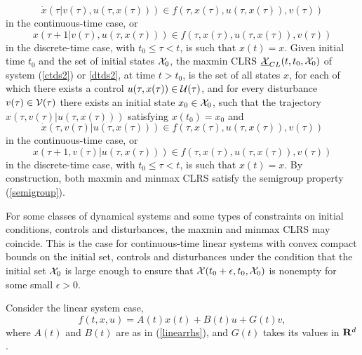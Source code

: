 \[ \dot{x}(\tau | v(\tau), u(\tau, x(\tau))) \in
f(\tau, x(\tau), u(\tau, x(\tau)), v(\tau)) \]
in the continuous-time case, or
\[ x(\tau+1 | v(\tau), u(\tau, x(\tau))) \in
f(\tau, x(\tau), u(\tau, x(\tau)), v(\tau)) \]
in the discrete-time case, with $t_0\leq\tau<t$, is such that $x(t)=x$.
\label{def_maxminclrs}
\ed
{}
Given initial time $t_0$ and the set of initial states $\XX_0$, the maxmin
CLRS $\UXCL(t, t_0, \XX_0)$ of system (\ref{ctds2}) or \ref{dtds2}, at time
$t>t_0$, is the set of all states $x$, for each of which there exists a control
$u(\tau, x(\tau))\in\UU(\tau)$, and for every disturbance $v(\tau)\in\VV(\tau)$
there exists  an initial state $x_0\in\XX_0$, such that the trajectory
$x(\tau, v(\tau) | u(\tau, x(\tau)))$ satisfying $x(t_0) = x_0$ and
\[ \dot{x}(\tau, v(\tau) | u(\tau, x(\tau))) \in
f(\tau, x(\tau), u(\tau, x(\tau)), v(\tau)) \]
in the continuous-time case, or
\[ x(\tau+1, v(\tau) | u(\tau, x(\tau))) \in
f(\tau, x(\tau), u(\tau, x(\tau)), v(\tau)) \]
in the discrete-time case, with $t_0\leq\tau<t$, is such that
$x(t)=x$.
\label{def_minmaxclrs}
\ed
By construction, both maxmin and minmax CLRS satisfy the
semigroup property (\ref{semigroup}).

For some classes of dynamical systems and some types of constraints
on initial conditions, controls and disturbances, the
maxmin and minmax CLRS may coincide.
This is the case for continuous-time linear systems
with convex compact bounds on the initial set, controls and disturbances
under the condition that the initial set $\XX_0$ is large enough to ensure that
$\XX(t_0+\epsilon, t_0, \XX_0)$ is nonempty for some small $\epsilon>0$.

Consider the linear system case,
\begin{equation}
f(t, x, u) = A(t)x(t) + B(t)u + G(t)v,
\label{linearrhsdist}
\end{equation}
where $A(t)$ and $B(t)$ are as in (\ref{linearrhs}), and
$G(t)$ takes its values in ${\bf R}^d$.

